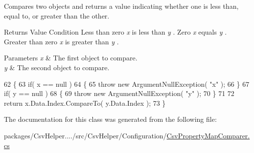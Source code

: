 Compares two objects and returns a value indicating whether one is less than, equal to, or greater than the other. 

\begin{DoxyReturn}{Returns}
Value Condition Less than zero {\itshape x}  is less than {\itshape y} . Zero {\itshape x}  equals {\itshape y} . Greater than zero {\itshape x}  is greater than {\itshape y} . 
\end{DoxyReturn}

\begin{DoxyParams}{Parameters}
{\em x} & The first object to compare. \\
\hline
{\em y} & The second object to compare. \\
\hline
\end{DoxyParams}

\begin{DoxyCode}
62         \{
63             \textcolor{keywordflow}{if}( x == null )
64             \{
65                 \textcolor{keywordflow}{throw} \textcolor{keyword}{new} ArgumentNullException( \textcolor{stringliteral}{"x"} );
66             \}
67             \textcolor{keywordflow}{if}( y == null )
68             \{
69                 \textcolor{keywordflow}{throw} \textcolor{keyword}{new} ArgumentNullException( \textcolor{stringliteral}{"y"} );
70             \}
71 
72             \textcolor{keywordflow}{return} x.Data.Index.CompareTo( y.Data.Index );
73         \}
\end{DoxyCode}


The documentation for this class was generated from the following file\-:\begin{DoxyCompactItemize}
\item 
packages/\-Csv\-Helper..../src/\-Csv\-Helper/\-Configuration/\hyperlink{a00185}{Csv\-Property\-Map\-Comparer.\-cs}\end{DoxyCompactItemize}
